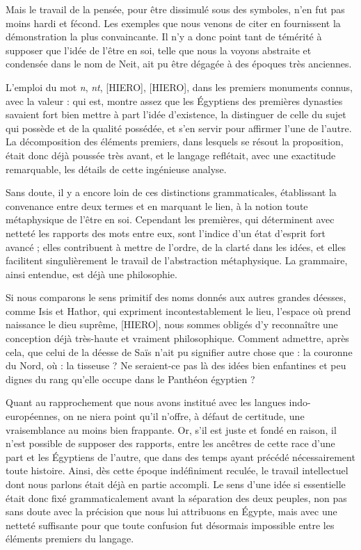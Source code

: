 \documentclass[a4paper, 11pt, oneside]{article}
\begin{document}
Mais le travail de la pensée, pour être dissimulé sous des symboles, n'en fut pas moins hardi et fécond. Les exemples que nous venons de citer en fournissent la démonstration la plus convaincante. Il n'y a donc point tant de témérité à supposer que l'idée de l'être en soi, telle que nous la voyons abstraite et condensée dans le nom de Neit, ait pu être dégagée à des époques très anciennes.

L'emploi du mot \emph{n}, \emph{nt}, [HIERO], [HIERO], dans les premiers monuments connus, avec la valeur : qui est, montre assez que les Égyptiens des premières dynasties savaient fort bien mettre à part l'idée d'existence, la distinguer de celle du sujet qui possède et de la qualité possédée, et s'en servir pour affirmer l'une de l'autre. La décomposition des éléments premiers, dans lesquels se résout la proposition, était donc déjà poussée très avant, et le langage reflétait, avec une exactitude remarquable, les détails de cette ingénieuse analyse.

Sans doute, il y a encore loin de ces distinctions grammaticales, établissant la convenance entre deux termes et en marquant le lien, à la notion toute métaphysique de l'être en soi. Cependant les premières, qui déterminent avec netteté les rapports des mots entre eux, sont l'indice d'un état d'esprit fort avancé ; elles contribuent à mettre de l'ordre, de la clarté dans les idées, et elles facilitent singulièrement le travail de l'abstraction métaphysique. La grammaire, ainsi entendue, est déjà une philosophie.

Si nous comparons le sens primitif des noms donnés aux autres grandes déesses, comme Isis et Hathor, qui expriment incontestablement le lieu, l'espace où prend naissance le dieu suprême, [HIERO], nous sommes obligés d'y reconnaître une conception déjà très-haute et vraiment philosophique. Comment admettre, après cela, que celui de la déesse de Saïs n'ait pu signifier autre chose que : la couronne du Nord, où : la tisseuse ? Ne seraient-ce pas là des idées bien enfantines et peu dignes du rang qu'elle occupe dans le Panthéon égyptien ?

Quant au rapprochement que nous avons institué avec les langues indo-européennes, on ne niera point qu'il n'offre, à défaut de certitude, une vraisemblance au moins bien frappante. Or, s'il est juste et fondé en raison, il n'est possible de supposer des rapports, entre les ancêtres de cette race d'une part et les Égyptiens de l'autre, que dans des temps ayant précédé nécessairement toute histoire. Ainsi, dès cette époque indéfiniment reculée, le travail intellectuel dont nous parlons était déjà en partie accompli. Le sens d'une idée si essentielle était donc fixé grammaticalement avant la séparation des deux peuples, non pas sans doute avec la précision que nous lui attribuons en Égypte, mais avec une netteté suffisante pour que toute confusion fut désormais impossible entre les éléments premiers du langage.
\end{document}
